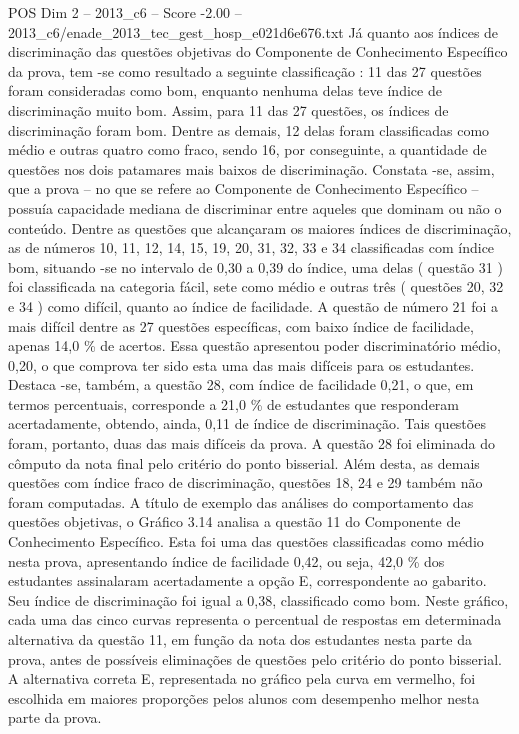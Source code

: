 \begin{textsample}{POS Dim 2 – 2013\_c6 – Score -2.00 – 2013\_c6/enade\_2013\_tec\_gest\_hosp\_e021d6e676.txt}
Já quanto aos índices de discriminação das questões objetivas do Componente de Conhecimento Específico da prova, tem -se como resultado a seguinte classificação : 11 das 27 questões foram consideradas como bom, enquanto nenhuma delas teve índice de discriminação muito bom.
Assim, para 11 das 27 questões, os índices de discriminação foram bom.
Dentre as demais, 12 delas foram classificadas como médio e outras quatro como fraco, sendo 16, por conseguinte, a quantidade de questões nos dois patamares mais baixos de discriminação.
Constata -se, assim, que a prova – no que se refere ao Componente de Conhecimento Específico – possuía capacidade mediana de discriminar entre aqueles que dominam ou não o conteúdo.
Dentre as questões que alcançaram os maiores índices de discriminação, as de números 10, 11, 12, 14, 15, 19, 20, 31, 32, 33 e 34 classificadas com índice bom, situando -se no intervalo de 0,30 a 0,39 do índice, uma delas ( questão 31 ) foi classificada na categoria fácil, sete como médio e outras três ( questões 20, 32 e 34 ) como difícil, quanto ao índice de facilidade.
A questão de número 21 foi a mais difícil dentre as 27 questões específicas, com baixo índice de facilidade, apenas 14,0 \% de acertos.
Essa questão apresentou poder discriminatório médio, 0,20, o que comprova ter sido esta uma das mais difíceis para os estudantes.
Destaca -se, também, a questão 28, com índice de facilidade 0,21, o que, em termos percentuais, corresponde a 21,0 \% de estudantes que responderam acertadamente, obtendo, ainda, 0,11 de índice de discriminação.
Tais questões foram, portanto, duas das mais difíceis da prova.
A questão 28 foi eliminada do cômputo da nota final pelo critério do ponto bisserial.
Além desta, as demais questões com índice fraco de discriminação, questões 18, 24 e 29 também não foram computadas.
A título de exemplo das análises do comportamento das questões objetivas, o Gráfico 3.14 analisa a questão 11 do Componente de Conhecimento Específico.
Esta foi uma das questões classificadas como médio nesta prova, apresentando índice de facilidade 0,42, ou seja, 42,0 \% dos estudantes assinalaram acertadamente a opção E, correspondente ao gabarito.
Seu índice de discriminação foi igual a 0,38, classificado como bom.
Neste gráfico, cada uma das cinco curvas representa o percentual de respostas em determinada alternativa da questão 11, em função da nota dos estudantes nesta parte da prova, antes de possíveis eliminações de questões pelo critério do ponto bisserial.
A alternativa correta E, representada no gráfico pela curva em vermelho, foi escolhida em maiores proporções pelos alunos com desempenho melhor nesta parte da prova.

\end{textsample}
